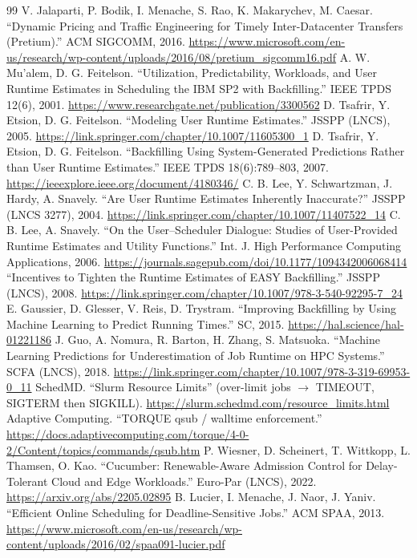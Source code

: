 \documentclass{article}
\begin{document}
\begin{thebibliography}{99}
 V. Jalaparti, P. Bodik, I. Menache, S. Rao, K. Makarychev, M. Caesar. ``Dynamic Pricing and Traffic Engineering for Timely Inter-Datacenter Transfers (Pretium).'' ACM SIGCOMM, 2016. \url{https://www.microsoft.com/en-us/research/wp-content/uploads/2016/08/pretium_sigcomm16.pdf}
 A. W. Mu'alem, D. G. Feitelson. ``Utilization, Predictability, Workloads, and User Runtime Estimates in Scheduling the IBM SP2 with Backfilling.'' IEEE TPDS 12(6), 2001. \url{https://www.researchgate.net/publication/3300562}
 D. Tsafrir, Y. Etsion, D. G. Feitelson. ``Modeling User Runtime Estimates.'' JSSPP (LNCS), 2005. \url{https://link.springer.com/chapter/10.1007/11605300_1}
 D. Tsafrir, Y. Etsion, D. G. Feitelson. ``Backfilling Using System-Generated Predictions Rather than User Runtime Estimates.'' IEEE TPDS 18(6):789--803, 2007. \url{https://ieeexplore.ieee.org/document/4180346/}
 C. B. Lee, Y. Schwartzman, J. Hardy, A. Snavely. ``Are User Runtime Estimates Inherently Inaccurate?'' JSSPP (LNCS 3277), 2004. \url{https://link.springer.com/chapter/10.1007/11407522_14}
 C. B. Lee, A. Snavely. ``On the User--Scheduler Dialogue: Studies of User-Provided Runtime Estimates and Utility Functions.'' Int. J. High Performance Computing Applications, 2006. \url{https://journals.sagepub.com/doi/10.1177/1094342006068414}
 ``Incentives to Tighten the Runtime Estimates of EASY Backfilling.'' JSSPP (LNCS), 2008. \url{https://link.springer.com/chapter/10.1007/978-3-540-92295-7_24}
 E. Gaussier, D. Glesser, V. Reis, D. Trystram. ``Improving Backfilling by Using Machine Learning to Predict Running Times.'' SC, 2015. \url{https://hal.science/hal-01221186}
 J. Guo, A. Nomura, R. Barton, H. Zhang, S. Matsuoka. ``Machine Learning Predictions for Underestimation of Job Runtime on HPC Systems.'' SCFA (LNCS), 2018. \url{https://link.springer.com/chapter/10.1007/978-3-319-69953-0_11}
 SchedMD. ``Slurm Resource Limits'' (over-limit jobs $\to$ TIMEOUT, SIGTERM then SIGKILL). \url{https://slurm.schedmd.com/resource_limits.html}
 Adaptive Computing. ``TORQUE qsub / walltime enforcement.'' \url{https://docs.adaptivecomputing.com/torque/4-0-2/Content/topics/commands/qsub.htm}
 P. Wiesner, D. Scheinert, T. Wittkopp, L. Thamsen, O. Kao. ``Cucumber: Renewable-Aware Admission Control for Delay-Tolerant Cloud and Edge Workloads.'' Euro-Par (LNCS), 2022. \url{https://arxiv.org/abs/2205.02895}
 B. Lucier, I. Menache, J. Naor, J. Yaniv. ``Efficient Online Scheduling for Deadline-Sensitive Jobs.'' ACM SPAA, 2013. \url{https://www.microsoft.com/en-us/research/wp-content/uploads/2016/02/spaa091-lucier.pdf}

\end{thebibliography}
\end{document}
